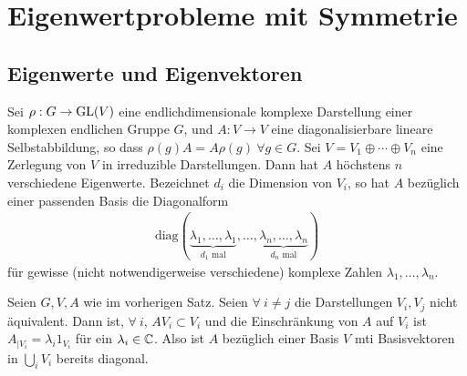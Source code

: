 \section{Eigenwertprobleme mit Symmetrie}

\subsection{Eigenwerte und Eigenvektoren}

\begin{satz}
    Sei $\rho: G \rightarrow \text{GL}(V)$ eine endlichdimensionale komplexe
    Darstellung einer komplexen endlichen Gruppe $G$, und $A: V \rightarrow V$
    eine diagonalisierbare lineare Selbstabbildung, so dass $\rho(g) A =
    A \rho(g) \ \forall g \in G$. Sei $V = V_1 \oplus \dotsb \oplus V_n$
    eine Zerlegung von $V$ in irreduzible Darstellungen. Dann hat $A$
    höchstens $n$ verschiedene Eigenwerte. Bezeichnet $d_i$ die
    Dimension von $V_i$, so hat $A$ bezüglich einer passenden Basis die
    Diagonalform
    \begin{align*}
        \text{diag} (\underbrace{\lambda_1,\dots,\lambda_1}_{d_1 \text{ mal}}
            ,\dots,\underbrace{\lambda_n,\dots,\lambda_n}_{d_n \text{ mal}})
    \end{align*}
    für gewisse (nicht notwendigerweise verschiedene) komplexe Zahlen
    $\lambda_1,\dots,\lambda_n$.
\end{satz}

\begin{satz}
    Seien $G,V,A$ wie im vorherigen Satz. Seien $\forall \ i \neq j$ die
    Darstellungen $V_i, V_j$ nicht äquivalent. Dann ist, $\forall \ i$,
    $A V_i \subset V_i$ und die Einschränkung von $A$ auf $V_i$ ist
    $A_{| V_i} = \lambda_i 1_{V_i}$ für ein $\lambda_i \in \mathbb{C}$.
    Also ist $A$ bezüglich einer Basis $V$ mti Basisvektoren in $\bigcup_i V_i$
bereits diagonal.
\end{satz}

